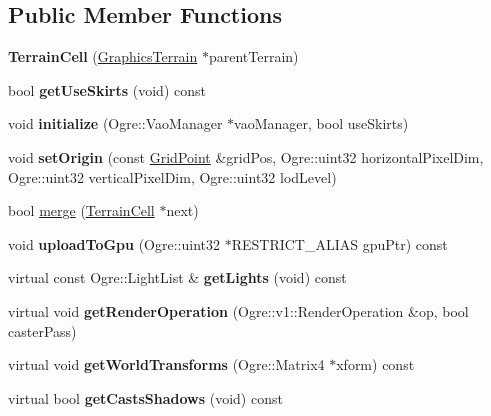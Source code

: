 \subsection*{Public Member Functions}
\begin{DoxyCompactItemize}
\item 
\mbox{\label{class_terrain_cell_a8e486aba1ecb56796b8398ab712b9ac2}} 
{\bfseries Terrain\+Cell} (\hyperlink{class_graphics_terrain}{Graphics\+Terrain} $\ast$parent\+Terrain)
\item 
\mbox{\label{class_terrain_cell_a480311a83246c2048b60a6eba1f3e5c1}} 
bool {\bfseries get\+Use\+Skirts} (void) const
\item 
\mbox{\label{class_terrain_cell_a4908343e288dd98834c943f73e7dc6ee}} 
void {\bfseries initialize} (Ogre\+::\+Vao\+Manager $\ast$vao\+Manager, bool use\+Skirts)
\item 
\mbox{\label{class_terrain_cell_ab2dd3afcb1879e45b98c54b108cf0204}} 
void {\bfseries set\+Origin} (const \hyperlink{struct_grid_point}{Grid\+Point} \&grid\+Pos, Ogre\+::uint32 horizontal\+Pixel\+Dim, Ogre\+::uint32 vertical\+Pixel\+Dim, Ogre\+::uint32 lod\+Level)
\item 
bool \hyperlink{class_terrain_cell_a18155abf464d4f6d1f3bf59a21eee301}{merge} (\hyperlink{class_terrain_cell}{Terrain\+Cell} $\ast$next)
\item 
\mbox{\label{class_terrain_cell_a3d59cf3485f39a7c21411eeaaffcd92a}} 
void {\bfseries upload\+To\+Gpu} (Ogre\+::uint32 $\ast$R\+E\+S\+T\+R\+I\+C\+T\+\_\+\+A\+L\+I\+AS gpu\+Ptr) const
\item 
\mbox{\label{class_terrain_cell_a798bc5d90c5fd2f3a840fb7f6d01d3b4}} 
virtual const Ogre\+::\+Light\+List \& {\bfseries get\+Lights} (void) const
\item 
\mbox{\label{class_terrain_cell_af9cce8bdbcd17ba23a98d49197619f76}} 
virtual void {\bfseries get\+Render\+Operation} (Ogre\+::v1\+::\+Render\+Operation \&op, bool caster\+Pass)
\item 
\mbox{\label{class_terrain_cell_af87d546b5cdcc1eb14b53f966765b8d4}} 
virtual void {\bfseries get\+World\+Transforms} (Ogre\+::\+Matrix4 $\ast$xform) const
\item 
\mbox{\label{class_terrain_cell_ae50fc017b6a731a35c4764df52f46628}} 
virtual bool {\bfseries get\+Casts\+Shadows} (void) const
\end{DoxyCompactItemize}
